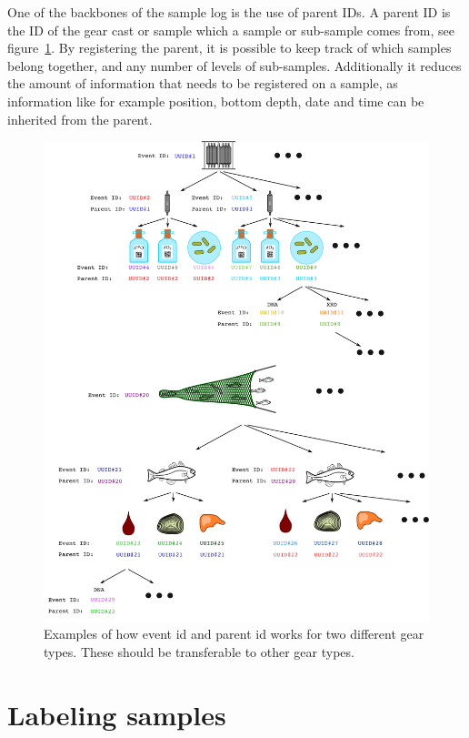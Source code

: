 \documentclass[a4paper,english, 11pt]{article}
\begin{document}
One of the backbones of the sample log is the use of parent IDs. A parent ID is the ID of the gear cast or sample which a sample or sub-sample comes from, see figure~\ref{fig:parent_uuid}. By registering the parent, it is possible to keep track of which samples belong together, and any number of levels of sub-samples. Additionally it reduces the amount of information that needs to be registered on a sample, as information like for example position, bottom depth, date and time can be inherited from the parent. 
\begin{figure}[hp]
    \centering
    \includegraphics[width=1\textwidth]{Labeling.pdf}
    \caption{\label{fig:parent_uuid}
       Examples of how event id and parent id works for two different gear types. These should be transferable to other gear types.
    }
\end{figure}

\section{Labeling samples} %
\label{sec:Labeling samples}
\end{document}
